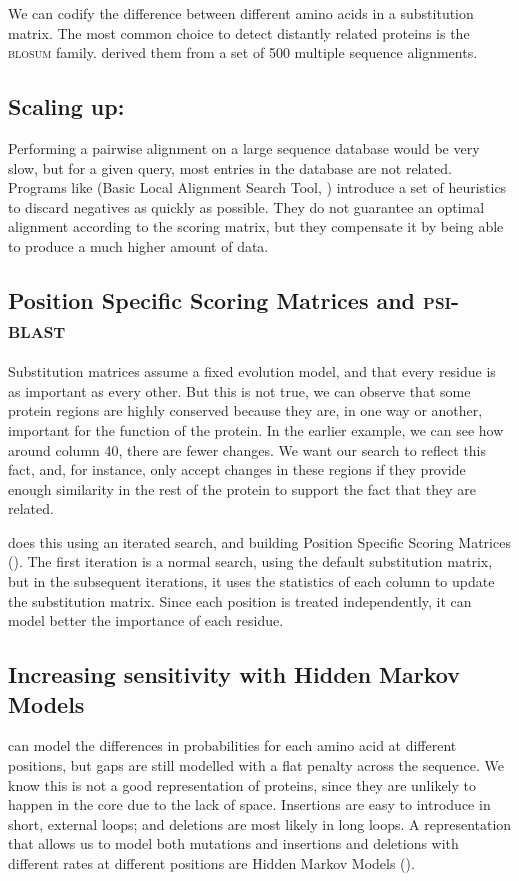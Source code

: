 We can codify the difference between different amino acids in a substitution matrix. 
The most common choice to detect distantly related proteins is the \textsc{blosum} family.
\citet{blosum} derived them from a set of 500 multiple sequence alignments.

\subsection{Scaling up: \BLAST}
Performing a pairwise alignment on a large sequence database would be very slow, but for a given query, most entries in the database are not related.
Programs like \BLAST{} (Basic Local Alignment Search Tool, \citep{blast}) introduce a set of heuristics to discard negatives as quickly as possible.
They do not guarantee an optimal alignment according to the scoring matrix, but they compensate it by being able to produce a much higher amount of data.

\subsection[\PSSMs{} and  \PSIBLAST]{Position Specific Scoring Matrices and \textsc{psi-blast}}

Substitution matrices assume a fixed evolution model, and that every residue is as important as every other.
But this is not true, we can observe that some protein regions are highly conserved because they are, in one way or another, important for the function of the protein.
In the earlier example, we can see how around column 40, there are fewer changes.
We want our search to reflect this fact, and, for instance, only accept changes in these regions if they provide enough similarity in the rest of the protein to support the fact that they are related.

\PSIBLAST{} \citep{psiblast} does this using an iterated search, and building Position Specific Scoring Matrices (\PSSM).
The first iteration is a normal \BLAST{} search, using the default substitution matrix, but in the subsequent iterations, it uses the statistics of each column to update the substitution matrix.
Since each position is treated independently, it can model better the importance of each residue.

\subsection[Hidden Markov Models]{Increasing sensitivity with Hidden Markov Models}
\PSSMs{} can model the differences in probabilities for each amino acid at different positions, but gaps are still modelled with a flat penalty across the sequence.
We know this is not a good representation of proteins, since they are unlikely to happen in the core due to the lack of space.
Insertions are easy to introduce in short, external loops; and deletions are most likely in long loops.
A representation that allows us to model both mutations and insertions and deletions with different rates at different positions are Hidden Markov Models (\HMM).

